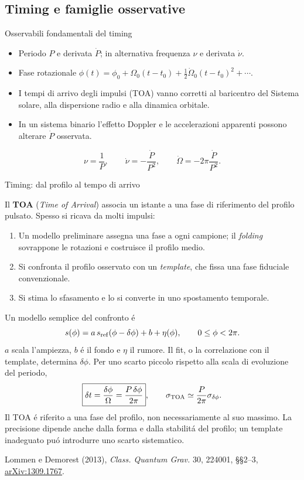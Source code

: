 \subsection{Timing e famiglie osservative}

\begin{frame}[t]{Osservabili fondamentali del timing}
\small
\begin{itemize}
\item Periodo $P$ e derivata $\dot P$; in alternativa frequenza $\nu$ e derivata $\dot\nu$.
\item Fase rotazionale $\phi(t)=\phi_0+\Omega_0(t-t_0)+\tfrac12\dot\Omega_0(t-t_0)^2+\cdots$.
\item I tempi di arrivo degli impulsi (TOA) vanno corretti al baricentro del Sistema solare, alla dispersione radio e alla dinamica orbitale.
\item In un sistema binario l'effetto Doppler e le accelerazioni apparenti possono alterare $\dot P$ osservata.
\end{itemize}
\[
\nu=\frac1P,\qquad\dot\nu=-\frac{\dot P}{P^2},\qquad
\dot\Omega=-2\pi\frac{\dot P}{P^2}.
\]
\end{frame}

\begin{frame}[t]{Timing: dal profilo al tempo di arrivo}
\vspace*{3mm}
\small\raggedright
Il \textbf{TOA} (\emph{Time of Arrival}) associa un istante a una fase
di riferimento del profilo pulsato. Spesso si ricava da molti impulsi:
\begin{enumerate}
\item Un modello preliminare assegna una fase a ogni campione;
il \emph{folding} sovrappone le rotazioni e costruisce il profilo medio.
\item Si confronta il profilo osservato con un \emph{template},
che fissa una fase fiduciale convenzionale.
\item Si stima lo sfasamento e lo si converte in uno spostamento temporale.
\end{enumerate}
Un modello semplice del confronto \'e
\[
s(\phi)=a\,s_{\rm ref}(\phi-\delta\phi)+b+\eta(\phi),
\qquad 0\leq\phi<2\pi.
\]
$a$ scala l'ampiezza, $b$ \'e il fondo e $\eta$ il rumore.
Il fit, o la correlazione con il template, determina $\delta\phi$.
Per uno scarto piccolo rispetto alla scala di evoluzione del periodo,
\[
\boxed{\delta t=\frac{\delta\phi}{\Omega}
=\frac{P\,\delta\phi}{2\pi}},
\qquad
\sigma_{\rm TOA}\simeq\frac{P}{2\pi}\sigma_{\delta\phi}.
\]
Il TOA \'e riferito a una fase del profilo, non necessariamente al suo massimo.
La precisione dipende anche dalla forma e dalla stabilit\'a del profilo;
un template inadeguato pu\'o introdurre uno scarto sistematico.
\par\smallskip
\footnotesize
Lommen e Demorest (2013), \emph{Class. Quantum Grav.} 30, 224001,
\S\S2--3, \href{https://arxiv.org/abs/1309.1767}{arXiv:1309.1767}.
\end{frame}

